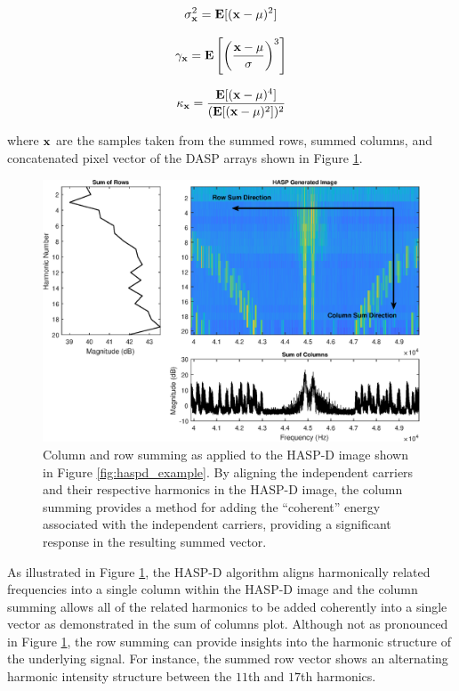 \begin{equation}
	\sigma^{2}_{\bf{x}} = \textbf{E}[(\textbf{x} - \mu)^2]
	\label{eq:sigmaeq}
\end{equation}

\begin{equation}
	\gamma_{\bf{x}} = \textbf{E}\left[\left(\frac{\textbf{x} - \mu}{\sigma}\right)^3\right]
	\label{eq:gammaeq}
\end{equation}

\begin{equation}
	\kappa_{\bf{x}} = \frac{\textbf{E}[(\textbf{x} - \mu)^4]}{(\textbf{E}[(\textbf{x} - \mu)^2])^2}
	\label{eq:kappaeq}
\end{equation}

where $\bf{x}$ are the samples taken from the summed rows, summed columns, and concatenated pixel vector of the DASP arrays shown in Figure \ref{fig:haspd_summation}.

\begin{figure}[ht]
	\includegraphics[width=\textwidth]{./dasp_algorithm_results/hasp_d_summing_filenum_9601.eps}
	\centering
	\caption{Column and row summing as applied to the HASP-D image shown in Figure \ref{fig:haspd_example}.  By aligning the independent carriers and their respective harmonics in the HASP-D image, the column summing provides a method for adding the ``coherent'' energy associated with the independent carriers, providing a significant response in the resulting summed vector.}
	\label{fig:haspd_summation}
\end{figure}

As illustrated in Figure \ref{fig:haspd_summation}, the HASP-D algorithm aligns harmonically related frequencies into a single column within the HASP-D image and the column summing allows all of the related harmonics to be added coherently into a single vector as demonstrated in the sum of columns plot.   Although not as pronounced in Figure \ref{fig:haspd_summation}, the row summing can provide insights into the harmonic structure of the underlying signal.  For instance, the summed row vector shows an alternating harmonic intensity structure between the $11$th and $17$th harmonics.

